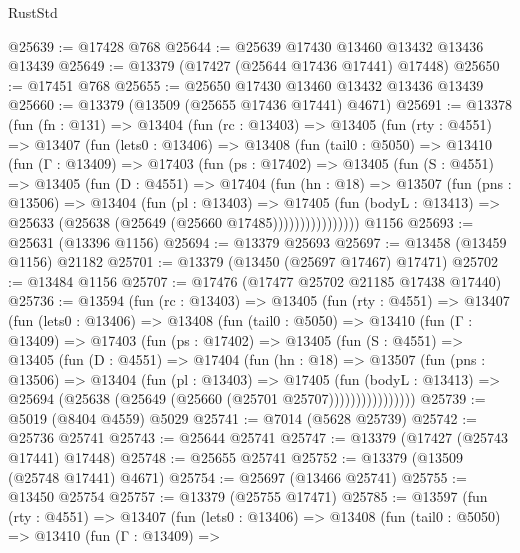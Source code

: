\begin{lexlean}{RustStd}
\begin{coremodule}
@25639 := @17428 @768
@25644 := @25639 @17430 @13460 @13432 @13436 @13439
@25649 := @13379 (@17427 (@25644 @17436 @17441) @17448)
@25650 := @17451 @768
@25655 := @25650 @17430 @13460 @13432 @13436 @13439
@25660 := @13379 (@13509 (@25655 @17436 @17441) @4671)
@25691 := @13378
    (fun (fn : @131) =>
    @13404
      (fun (rc : @13403) =>
      @13405
        (fun (rty : @4551) =>
        @13407
          (fun (lets0 : @13406) =>
          @13408
            (fun (tail0 : @5050) =>
            @13410
              (fun (Γ : @13409) =>
              @17403
                (fun (ps : @17402) =>
                @13405
                  (fun (S : @4551) =>
                  @13405
                    (fun (D : @4551) =>
                    @17404
                      (fun (hn : @18) =>
                      @13507
                        (fun (pns : @13506) =>
                        @13404
                          (fun (pl : @13403) =>
                          @17405
                            (fun (bodyL : @13413) =>
                            @25633 (@25638 (@25649 (@25660 @17485))))))))))))))))
    @1156
@25693 := @25631 (@13396 @1156)
@25694 := @13379 @25693
@25697 := @13458 (@13459 @1156) @21182
@25701 := @13379 (@13450 (@25697 @17467) @17471)
@25702 := @13484 @1156
@25707 := @17476 (@17477 @25702 @21185 @17438 @17440)
@25736 := @13594
    (fun (rc : @13403) =>
    @13405
      (fun (rty : @4551) =>
      @13407
        (fun (lets0 : @13406) =>
        @13408
          (fun (tail0 : @5050) =>
          @13410
            (fun (Γ : @13409) =>
            @17403
              (fun (ps : @17402) =>
              @13405
                (fun (S : @4551) =>
                @13405
                  (fun (D : @4551) =>
                  @17404
                    (fun (hn : @18) =>
                    @13507
                      (fun (pns : @13506) =>
                      @13404
                        (fun (pl : @13403) =>
                        @17405
                          (fun (bodyL : @13413) =>
                          @25694 (@25638 (@25649 (@25660 (@25701 @25707))))))))))))))))
@25739 := @5019 (@8404 @4559) @5029
@25741 := @7014 (@5628 @25739)
@25742 := @25736 @25741
@25743 := @25644 @25741
@25747 := @13379 (@17427 (@25743 @17441) @17448)
@25748 := @25655 @25741
@25752 := @13379 (@13509 (@25748 @17441) @4671)
@25754 := @25697 (@13466 @25741)
@25755 := @13450 @25754
@25757 := @13379 (@25755 @17471)
@25785 := @13597
    (fun (rty : @4551) =>
    @13407
      (fun (lets0 : @13406) =>
      @13408
        (fun (tail0 : @5050) =>
        @13410
          (fun (Γ : @13409) =>

\end{coremodule}
\end{lexlean}
